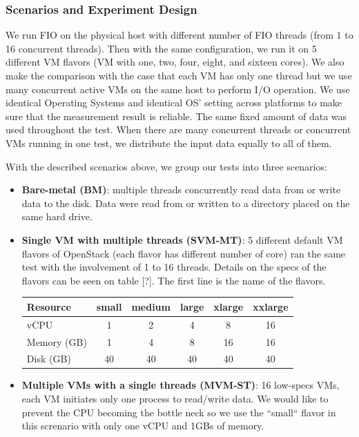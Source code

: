 \documentclass{acmsig}
\begin{document}
\subsubsection{Scenarios and Experiment Design}

We run FIO on the physical host with different number of FIO threads (from 1 to 16 concurrent threads). Then with the same configuration, we run it on 5 different VM flavors (VM with one, two, four, eight, and sixteen cores). We also make the comparison with the case that each VM has only one thread but we use many concurrent active VMs on the same host to perform I/O operation. We use identical Operating Systems and identical OS' setting across platforms to make sure that the measurement result is reliable. The same fixed amount of data was used throughout the test. When there are many concurrent threads or concurrent VMs running in one test, we distribute the input data equally to all of them.

With the described scenarios above, we group our tests into three scenarios:
\begin{itemize}
  \item \textbf{Bare-metal (BM)}: multiple threads concurrently read data from or write data to the disk. Data were read from or written to a directory placed on the same hard drive.

  \item \textbf{Single VM with multiple threads (SVM-MT)}: 5 different default VM flavors of OpenStack (each flavor has different number of core) ran the same test with the involvement of 1 to 16 threads. Details on the specs of the flavors can be seen on table [?]. The first line is the name of the flavors.
      \begin{table}[h!]
      \begin{tabular}{|l|c|c|c|c|c|}
      \hline
      Resource & small & medium & large & xlarge & xxlarge \\
      \hline
      vCPU & 1 & 2 & 4 & 8 & 16 \\
      Memory (GB)& 1 & 4 & 8 & 16 & 16 \\
      Disk (GB)& 40 & 40 & 40 & 40 & 40 \\
      \hline
      \end{tabular}
      \end{table}
  \item \textbf{Multiple VMs with a single threads (MVM-ST)}: 16 low-specs VMs, each VM initiates only one process to read/write data. We would like to prevent the CPU becoming the bottle neck so we use the ``small`` flavor in this screnario with only one vCPU and 1GBs of memory.
\end{itemize}
\end{document}
